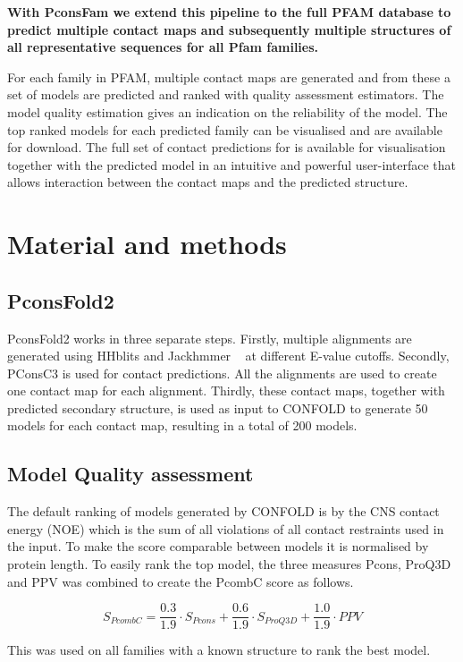 \documentclass[a4,center,fleqn]{NAR}
\begin{document}
{\bf With
PconsFam we extend this pipeline to the full PFAM database to predict
multiple contact maps and subsequently multiple structures of all
representative sequences for all Pfam families. }

\newpage
For each family in
PFAM, multiple contact maps are generated and from these a set of
models are predicted and ranked with quality assessment
estimators. The model quality estimation gives an indication on the
reliability of the model. 
The top ranked models for each predicted
family can be visualised and are available for download. The full set
of contact predictions for is available for visualisation together
with the predicted model in an intuitive and powerful user-interface
that allows interaction between the contact maps and the predicted
structure. 

\section{Material and methods}
\subsection{PconsFold2}
PconsFold2 works in three separate steps. Firstly, multiple alignments
are generated using HHblits and Jackhmmer ~\cite{eddy22039361} at different 
E-value cutoffs.
Secondly, PConsC3 is used for contact predictions. All the alignments are used to 
create one contact map for each alignment.
Thirdly, these contact maps, together with predicted secondary structure, is used
as input to CONFOLD to generate 50 models for each contact map, resulting in a total
of 200 models.

\subsection{Model Quality assessment}
The default ranking of models generated by CONFOLD is by the CNS contact energy (NOE) 
which is the sum of all violations of all contact restraints used in the input.
To make the score comparable between models it is normalised by protein length.
To easily rank the top model, the three measures Pcons, ProQ3D and PPV was 
combined to create the PcombC score as follows.

$$
S_{PcombC} = \frac{0.3}{1.9} \cdot S_{Pcons} + \frac{0.6}{1.9} \cdot S_{ProQ3D} + \frac{1.0}{1.9} \cdot PPV
$$

This was used on all families with a known structure to rank the best model.
\end{document}
